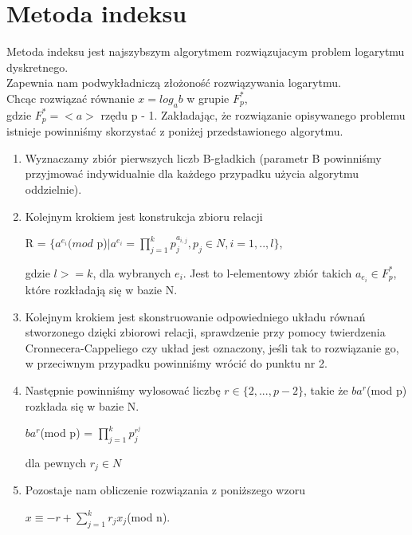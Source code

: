 \documentclass{article}
\begin{document}
\section{Metoda indeksu}
Metoda indeksu jest najszybszym algorytmem rozwiązujacym problem logarytmu dyskretnego.\\
Zapewnia nam podwykładniczą złożoność rozwiązywania logarytmu.\\
Chcąc rozwiązać równanie $x=log_ab$ w grupie $F_p^*$,\\
gdzie $F_p^* = <a>$ rzędu p - 1. Zakładając, że rozwiązanie opisywanego problemu istnieje powinniśmy skorzystać z poniżej przedstawionego algorytmu.
\begin{enumerate}
    \item  Wyznaczamy zbiór pierwszych liczb B-gładkich (parametr B powinniśmy przyjmować indywidualnie dla każdego przypadku użycia algorytmu oddzielnie).
    \item Kolejnym krokiem jest konstrukcja zbioru relacji
    \begin{center}
        R = $\{a^{e_i}(mod$ p)$| a^{e_i} =  \prod_{j = 1}^{k} p_j^{a_{i,j}}, p_j \in N, i = 1, .. ,l\} $,\\
    \end{center}
    gdzie $l >= k$, dla wybranych $e_i$. Jest to l-elementowy zbiór takich $a_{e_i} \in F_p^*$, które rozkładają się w bazie N.
    \item Kolejnym krokiem jest skonstruowanie odpowiedniego układu równań stworzonego dzięki zbiorowi relacji, sprawdzenie przy pomocy twierdzenia Cronnecera-Cappeliego czy układ jest oznaczony, jeśli tak to rozwiązanie go, w przeciwnym przypadku powinniśmy wrócić do punktu nr 2.
    \item Następnie powinniśmy wylosować liczbę $r \in \{2, ..., p-2\}$, takie że $ba^r$(mod p) rozkłada się w bazie N. 
    \begin{center}
        $ba^r$(mod p) = $\prod_{j = 1}^{k} p_j^{r^j}$
    \end{center}
    dla pewnych $r_j \in N$
    \item Pozostaje nam obliczenie rozwiązania z poniższego wzoru\\
    \begin{center}
        $x \equiv -r + \sum_{j=1}^{k} r_jx_j$(mod n).
    \end{center}
\end{enumerate}
 
\end{document}
